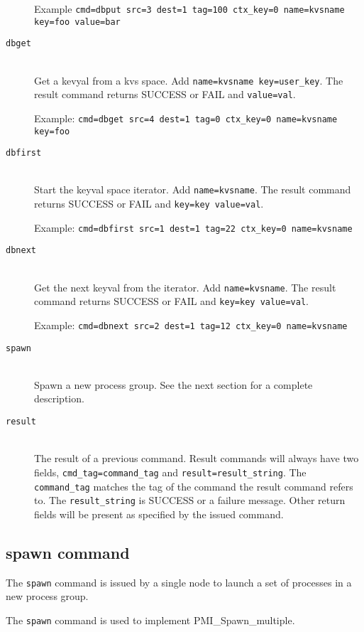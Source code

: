 \documentclass[dvipdfm,11pt]{article}
\begin{document}
\begin{description}
Example \texttt{cmd=dbput src=3 dest=1 tag=100 ctx\_key=0 name=kvsname key=foo value=bar}
\item[\texttt{dbget}]\mbox{}\\
Get a kevyal from a kvs space.  Add \texttt{name=kvsname key=user\_key}.
The result command returns SUCCESS or FAIL and \texttt{value=val}.

Example: \texttt{cmd=dbget src=4 dest=1 tag=0 ctx\_key=0 name=kvsname key=foo}
\item[\texttt{dbfirst}]\mbox{}\\
Start the keyval space iterator.  Add \texttt{name=kvsname}.
The result command returns SUCCESS or FAIL and \texttt{key=key value=val}.

Example: \texttt{cmd=dbfirst src=1 dest=1 tag=22 ctx\_key=0 name=kvsname}
\item[\texttt{dbnext}]\mbox{}\\
Get the next keyval from the iterator.  Add \texttt{name=kvsname}.
The result command returns SUCCESS or FAIL and \texttt{key=key value=val}.

Example: \texttt{cmd=dbnext src=2 dest=1 tag=12 ctx\_key=0 name=kvsname}
\item[\texttt{spawn}]\mbox{}\\
Spawn a new process group.  See the next section for a complete description.
\item[\texttt{result}]\mbox{}\\
The result of a previous command.  Result commands will always have two 
fields, \texttt{cmd\_tag=command\_tag} and \texttt{result=result\_string}.
The \texttt{command\_tag} matches the tag of the command the result command 
refers to.  The \texttt{result\_string} is SUCCESS or a failure message. 
Other return fields will be present as specified by the issued command.
\end{description}

\subsection{spawn command}
The \texttt{spawn} command is issued by a single node to launch a set of 
processes in a new process group.

The \texttt{spawn} command is used to implement PMI\_Spawn\_multiple.
\end{document}
